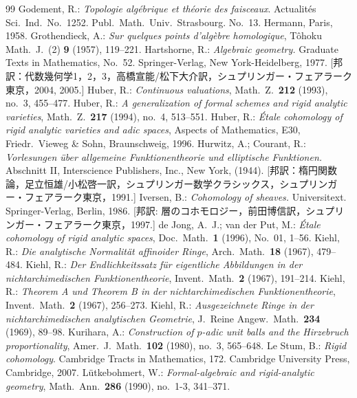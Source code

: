 \documentclass[a4paper,12pt, dvipdfmx]{jsbook}
\theoremstyle{plain}
\theoremstyle{definition}
\begin{document}
\begin{thebibliography}{99}
Godement, R.: {\it Topologie alg\'ebrique et th\'eorie des faisceaux}. Actualit\'es Sci.\ Ind.\ No.\ 1252. Publ.\ Math.\ Univ.\ Strasbourg. No.\ 13. Hermann, Paris, 1958.
Grothendieck, A.: {\it Sur quelques points d'alg\`{e}bre homologique}, T\^{o}hoku Math.\ J.\ (2) {\bf 9} (1957), 119--221.
Hartshorne, R.: {\it Algebraic geometry.} Graduate Texts in Mathematics, No.\ 52. Springer-Verlag, New York-Heidelberg, 1977. [邦訳：代数幾何学1，2，3，高橋宣能/松下大介訳，シュプリンガー・フェアラーク東京，2004, 2005.]
Huber, R.: {\it Continuous valuations}, Math.\ Z.\ {\bf 212} (1993), no.\ 3, 455--477.
Huber, R.: {\it A generalization of formal schemes and rigid analytic varieties}, Math.\ Z.\ {\bf 217} (1994), no.\ 4, 513--551.
Huber, R.: {\it \'Etale cohomology of rigid analytic varieties and adic spaces}, Aspects of Mathematics, E30, Friedr.\ Vieweg \& Sohn, Braunschweig, 1996.
Hurwitz, A.; Courant, R.: {\it Vorlesungen \"uber allgemeine Funktionentheorie und elliptische Funktionen.} Abschnitt II, Interscience Publishers, Inc., New York, (1944). [邦訳：楕円関数論，足立恒雄/小松啓一訳，シュプリンガー数学クラシックス，シュプリンガー・フェアラーク東京，1991.]
Iversen, B.: {\it Cohomology of sheaves.} Universitext. Springer-Verlag, Berlin, 1986. [邦訳: 層のコホモロジー，前田博信訳，シュプリンガー・フェアラーク東京，1997.]
de Jong, A.\ J.; van der Put, M.: {\it \'Etale cohomology of rigid analytic spaces}, Doc.\ Math.\ {\bf 1} (1996), No.\ 01, 1--56.
Kiehl, R.: {\it Die analytische Normalit\"at affinoider Ringe}, Arch.\ Math.\ {\bf 18} (1967), 479--484. 
Kiehl, R.: {\it Der Endlichkeitssatz f\"ur eigentliche Abbildungen in der nichtarchimedischen Funktionentheorie}, Invent.\ Math.\ {\bf 2} (1967), 191--214.
Kiehl, R.: {\it Theorem A und Theorem B in der nichtarchimedischen Funktionentheorie}, Invent.\ Math.\ {\bf 2} (1967), 256--273.
Kiehl, R.: {\it Ausgezeichnete Ringe in der nichtarchimedischen analytischen Geometrie}, J.\ Reine Angew.\ Math.\ {\bf 234} (1969), 89--98. 
Kurihara, A.: {\it Construction of $p$-adic unit balls and the Hirzebruch proportionality}, Amer.\ J.\ Math.\ {\bf 102} (1980), no.\ 3, 565--648.
Le Stum, B.: {\it Rigid cohomology}. Cambridge Tracts in Mathematics, 172. Cambridge University Press, Cambridge, 2007.
L\"utkebohmert, W.: {\it Formal-algebraic and rigid-analytic geometry}, Math.\ Ann.\ {\bf 286} (1990), no.\ 1-3, 341--371. 

\end{thebibliography}
\end{document}
